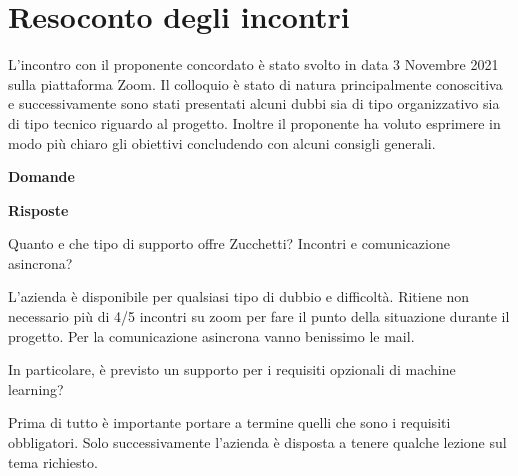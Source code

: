 \section{Resoconto degli incontri}
L’incontro con il proponente concordato è stato svolto in data 3 Novembre 2021 sulla piattaforma Zoom. Il colloquio è stato di natura principalmente conoscitiva e successivamente sono stati presentati alcuni dubbi sia di tipo organizzativo sia di tipo tecnico riguardo al progetto. Inoltre il proponente ha voluto esprimere in modo più chiaro gli obiettivi concludendo con alcuni consigli generali.

\begin{spacing}{2}
\end{spacing}

\begin{minipage}[b]{0.47\textwidth}
\centering
\textbf{Domande}
\end{minipage}
\hfill
\begin{minipage}[b]{0.47\textwidth}
\centering
\textbf{Risposte}
\end{minipage}

\begin{spacing}{3}
\end{spacing}

\begin{minipage}[c]{0.47\textwidth}
\centering
Quanto e che tipo di supporto offre Zucchetti? Incontri e comunicazione asincrona?
\end{minipage}
\hfill
\begin{minipage}[c]{0.47\textwidth}
\centering
L’azienda è disponibile per qualsiasi tipo di dubbio e difficoltà. Ritiene non necessario più di 4/5 incontri su zoom per fare il punto della situazione durante il progetto. Per la comunicazione asincrona vanno benissimo le mail.
\end{minipage}

\begin{spacing}{3}
\end{spacing}

\begin{minipage}[c]{0.47\textwidth}
\centering
In particolare, è previsto un supporto per i requisiti opzionali di machine learning?
\end{minipage}
\hfill
\begin{minipage}[c]{0.47\textwidth}
\centering
Prima di tutto è importante portare a termine quelli che sono i requisiti obbligatori. Solo successivamente l’azienda è disposta a tenere qualche lezione sul tema richiesto.
\end{minipage}


